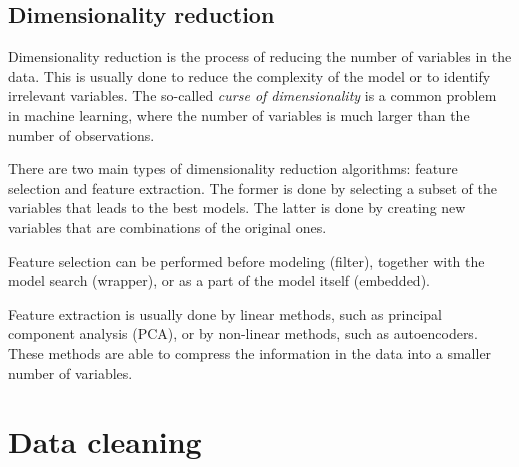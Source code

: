 \subsection{Dimensionality reduction}

Dimensionality reduction is the process of reducing the number of variables in the data.
This is usually done to reduce the complexity of the model or to identify irrelevant
variables.  The so-called \emph{curse of dimensionality} is a common problem in machine
learning, where the number of variables is much larger than the number of observations.

There are two main types of dimensionality reduction algorithms: feature selection and
feature extraction.  The former is done by selecting a subset of the variables that leads
to the best models.  The latter is done by creating new variables that are combinations
of the original ones.

Feature selection can be performed before modeling (filter), together with the model
search (wrapper), or as a part of the model itself (embedded).

Feature extraction is usually done by linear methods, such as principal component analysis
(PCA), or by non-linear methods, such as autoencoders.  These methods are able to
compress the information in the data into a smaller number of variables.



\section{Data cleaning}

